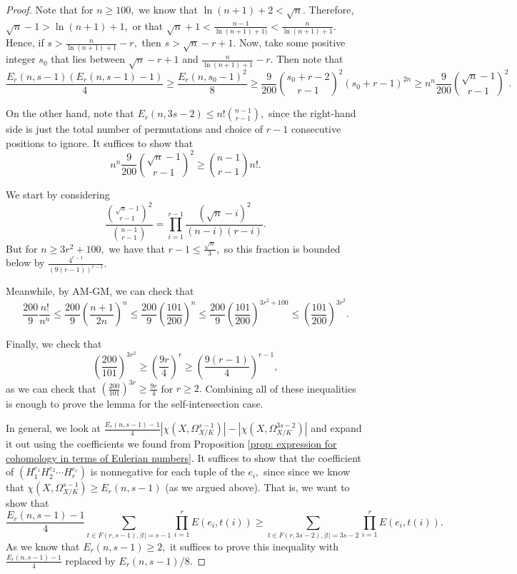 \documentclass{article}
\theoremstyle{definition}
\theoremstyle{remark}
\begin{document}
\begin{proof}
\par Note that for $n \geq 100,$ we know that $\ln (n+1) + 2 < \sqrt{n}.$ Therefore, $\sqrt{n} - 1 > \ln (n+1) + 1,$ or that $\sqrt{n} + 1 < \frac{n - 1}{\ln (n+1) + 1)} < \frac{n}{\ln(n+1) + 1}.$ Hence, if $s > \frac{n}{\ln (n+1) + 1} - r,$ then $s > \sqrt{n} - r + 1.$ Now, take some positive integer $s_0$ that lies between $\sqrt{n} - r + 1$ and $\frac{n}{\ln (n+1) + 1} - r.$ Then note that $$\frac{E_r(n, s-1)(E_r(n, s-1) - 1)}{4} \geq \frac{E_r(n, s_0 - 1)^2}{8} \geq \frac{9}{200} \binom{s_0 + r - 2}{r-1}^2(s_0 + r - 1)^{2n} \geq n^n \frac{9}{200} \binom{\sqrt{n} - 1}{{r-1}}^2.$$
\par On the other hand, note that $E_r(n, 3s - 2) \leq n! \binom{n - 1}{r-1},$ since the right-hand side is just the total number of permutations and choice of $r-1$ consecutive positions to ignore. It suffices to show that $$n^n \frac{9}{200} \binom{\sqrt{n} - 1}{{r-1}}^2 \geq \binom{n - 1}{r-1} n!.$$ 
\par We start by considering \[ \frac{\binom{\sqrt{n} - 1}{r-1}^2}{\binom{n-1}{r-1}} = \prod\limits_{i=1}^{r-1} \frac{(\sqrt{n} - i)^2}{(n-i)(r-i)}.\] But for $n \geq 3r^2 + 100,$ we have that $r - 1 \leq \frac{\sqrt{n}}{3},$ so this fraction is bounded below by $\frac{4^{r-1}}{(9(r-1))^{r-1}}.$
\par Meanwhile, by AM-GM, we can check that \[\frac{200}{9} \frac{n!}{n^n} \leq \frac{200}{9}(\frac{n+1}{2n})^n \leq \frac{200}{9} (\frac{101}{200})^n \leq \frac{200}{9} \left(\frac{101}{200}\right)^{3r^2 + 100} \leq \left(\frac{101}{200}\right)^{3r^2}.\]
\par Finally, we check that $$\left(\frac{200}{101}\right)^{3r^2} \geq \left(\frac{9r}{4}\right)^r \geq \left(\frac{9(r-1)}{4}\right)^{r-1},$$ as we can check that $\left(\frac{200}{101}\right)^{3r} \geq \frac{9r}{4}$ for $r \geq 2.$ Combining all of these inequalities is enough to prove the lemma for the self-intersection case.
\par In general, we look at $\frac{E_r(n, s-1) - 1}{4} |\chi(X, \Omega^{s-1}_{X/K})| - |\chi(X, \Omega_{X/K}^{3s-2})|$ and expand it out using the coefficients we found from Proposition \ref{prop: expression for cohomology in terms of Eulerian numbers}. It suffices to show that the coefficient of $(H_1^{e_1} H_2^{e_2} \cdots H_r^{e_r})$ is nonnegative for each tuple of the $e_i,$ since  since we know that $\chi(X,\Omega^{s-1}_{X/K}) \geq E_r(n, s-1)$ (as we argued above). That is, we want to show that \[\frac{E_r(n, s-1) - 1}{4} \sum\limits_{t \in F(r, s-1), |t| = s-1} \prod\limits_{i=1}^r E(e_i, t(i)) \geq \sum\limits_{t \in F(r, 3s-2), |t| = 3s-2} \prod\limits_{i=1}^r E(e_i, t(i)).\] As we know that $E_r(n, s-1) \geq 2,$ it suffices to prove this inequality with $\frac{E_r(n, s-1) - 1}{4}$ replaced by $E_r(n, s-1)/8.$

\end{proof}
\end{document}

